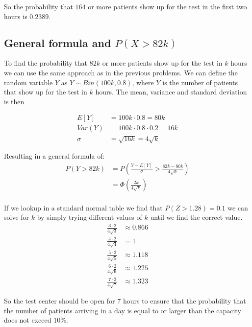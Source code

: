 So the probability that $164$ or more patients show up for the test in the first two hours is $0.2389$.

\subsection{General formula and $P(X > 82k)$}
To find the probability that $82k$ or more patients show up for the test in $k$ hours we can use the same approach as in the previous problems. We can define the random variable $Y$ as $Y \sim Bin(100k, 0.8)$, where $Y$ is the number of patients that show up for the test in $k$ hours. The mean, variance and standard deviation is then

\begin{align*}
	E[Y]   & = 100k \cdot 0.8 = 80k           \\
	Var(Y) & = 100k \cdot 0.8 \cdot 0.2 = 16k \\
	\sigma & = \sqrt{16k} = 4\sqrt{k}
\end{align*}

Resulting in a general formula of:
\begin{align*}
	P(Y > 82k) & = P\left(\frac{Y - E[Y]}{\sigma} > \frac{82k - 80k}{4\sqrt{k}}\right) \\
	           & = \Phi\left(\frac{2k}{4\sqrt{k}}\right)                               \\
\end{align*}

If we lookup in a standard normal table we find that $P(Z > 1.28) = 0.1$ we can solve for $k$ by simply trying different values of $k$ until we find the correct value.
\begin{align*}
	\frac{3 \cdot 2}{4\sqrt{3}} & \approx 0.866 \\
	\frac{4 \cdot 2}{4\sqrt{4}} & = 1           \\
	\frac{5 \cdot 2}{4\sqrt{5}} & \approx 1.118 \\
	\frac{6 \cdot 2}{4\sqrt{6}} & \approx 1.225 \\
	\frac{7 \cdot 2}{4\sqrt{7}} & \approx 1.323
\end{align*}

So the test center should be open for $7$ hours to ensure that the probability that the number of patients arriving in a day is equal to or larger than the capacity does not exceed $10\%$.
